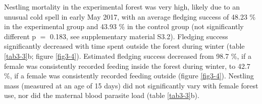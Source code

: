 \documentclass[10pt, twoside]{book} %
\begin{document}
Nestling mortality in the experimental forest was very high, likely due to an unusual cold spell in early May 2017, with an average fledging success of 48.23 \% in the experimental group and 43.93 \% in the control group (not significantly different p $=$ 0.183, see supplementary material S3.2). Fledging success significantly decreased with time spent outside the forest during winter (table \ref{tab3-3}b; figure \ref{fig3-4}). Estimated fledging success decreased from 98.7 \%, if a female was consistently recorded feeding inside the forest during winter, to 42.7 \%, if a female was consistently recorded feeding outside (figure \ref{fig3-4}). Nestling mass (measured at an age of 15 days) did not significantly vary with female forest use, nor did the maternal blood parasite load (table \ref{tab3-3}b).

	\clearpage
\end{document}

